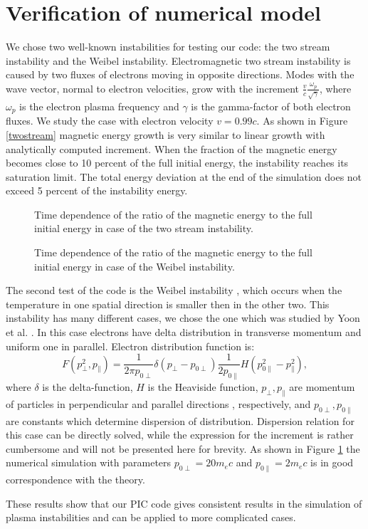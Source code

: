 \section{Verification of numerical model}
We chose two well-known instabilities for testing our code: the two stream instability and the Weibel instability. Electromagnetic two stream instability is caused by two fluxes of electrons moving in opposite directions. Modes with the wave vector, normal to electron velocities, grow with the increment $\frac {v}{c}\frac{\omega_{p}}{\sqrt{\gamma}}$, where $\omega_{p}$ is the electron plasma frequency and $\gamma$ is the gamma-factor of both electron fluxes. We study the case with electron velocity $v=0.99c$. As shown in Figure \ref{twostream} magnetic energy growth is very similar to linear growth with analytically computed increment. When the fraction of the magnetic energy becomes close to 10 percent of the full initial energy, the instability reaches its saturation limit. The total energy deviation at the end of the simulation does not exceed 5 percent of the instability energy.
\begin{figure}[h!]
	\centering
	\begin{minipage}{0.49\textwidth}
		\caption{Time dependence of the ratio of the magnetic energy to the full initial energy  in case of the two stream instability.}
		\label{twostream}
	\end{minipage}\hfill
	\begin{minipage}{0.49\textwidth}
		\caption{Time dependence of the ratio of the magnetic energy to the full initial energy  in case of the Weibel instability.}
		\label{weibel}
	\end{minipage}
\end{figure}

The second test of the code is the Weibel instability \cite{Weibel1959}, which occurs when the temperature in one spatial direction is smaller then in the other two. This instability has many different cases, we chose the one which was studied by Yoon et al. \cite{Yoon1987}. In this case electrons have delta distribution in transverse momentum and uniform one in parallel. Electron distribution function is:
\begin{equation}
F\left(p_\perp^2, p_\parallel\right)=\frac{1}{2\pi p_{0\perp}}\delta\left(p_\perp - p_{0\perp}\right)\frac{1}{2p_{0\parallel}}H(p_{0\parallel}^2-p_\parallel^2),
\end{equation}
where $\delta$ is the delta-function, $H$ is the Heaviside function, $p_\perp, p_\parallel$ are momentum of particles in perpendicular and parallel directions , respectively, and $p_{0\perp}, p_{0\parallel}$ are constants which determine dispersion of distribution. Dispersion relation for this case can be directly solved, while the expression for the increment is rather cumbersome and will not be presented here for brevity. As shown in Figure \ref{weibel} the numerical simulation with parameters $p_{0\perp} = 20m_e c$ and $p_{0\parallel} = 2 m_e c$ is in good correspondence with the theory.

These results show that our PIC code gives consistent results in the simulation of plasma instabilities and can be applied to more complicated cases.